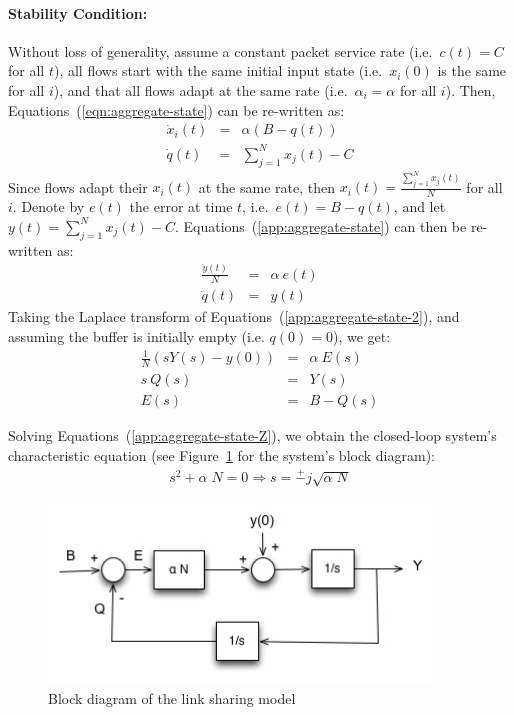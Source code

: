 \documentclass{article}
\begin{document}
\paragraph{Stability Condition:}
Without loss of generality,
assume a constant packet service rate
(i.e.\ $c(t) = C$ for all $t$),
all flows start with the same initial input state
(i.e.\ $x_i(0)$ is the same for all $i$),
and that all flows adapt at the same rate
(i.e.\ $\alpha_i = \alpha$ for all $i$).
Then, Equations~(\ref{eqn:aggregate-state}) can be re-written as:
\begin{eqnarray}
\dot{x}_i(t) &=& \alpha (B-q(t))  \nonumber \\ 
\dot{q}(t) &=& \sum_{j=1}^{N} x_j(t) - C 
\label{app:aggregate-state}
\end{eqnarray}
Since flows adapt their $x_i(t)$ at the same rate,
then $x_i(t) = \frac{\sum_{j=1}^{N} x_j(t)}{N}$ for all $i$.
Denote by $e(t)$ the error at time $t$,
i.e.\ $e(t) = B-q(t)$,
and let $y(t) =  \sum_{j=1}^{N} x_j(t) - C$.
Equations~(\ref{app:aggregate-state}) can then be re-written as:
\begin{eqnarray}
\frac{\dot{y}(t)}{N} &=& \alpha\ e(t)  \nonumber \\ 
\dot{q}(t) &=& y(t)
\label{app:aggregate-state-2}
\end{eqnarray}
Taking the Laplace transform 
of Equations~(\ref{app:aggregate-state-2}), 
and assuming the buffer is initially empty (i.e. $q(0)=0$),
we get:
\begin{eqnarray}
\frac{1}{N} (s Y(s) - y(0))  &=& \alpha\ E(s)  \nonumber \\ 
s\ Q(s) &=& Y(s) \nonumber \\
E(s) &=& B - Q(s) 
\label{app:aggregate-state-Z}
\end{eqnarray}

Solving Equations~(\ref{app:aggregate-state-Z}), we obtain the closed-loop system's characteristic equation
(see Figure~\ref{fig:case1-block} for the system's block diagram):
\begin{eqnarray}
s^2 + \alpha\; N = 0 \Rightarrow s = \stackrel{+}{-} j \sqrt{\alpha\; N}
\label{eqn:poles-aggr}
\end{eqnarray}

\begin{figure}[htbp] %
   \centering
   \includegraphics[width=4in]{figures/case1-block.jpg} 
   \caption{Block diagram of the link sharing model}
   \label{fig:case1-block}
\end{figure}
\end{document}
